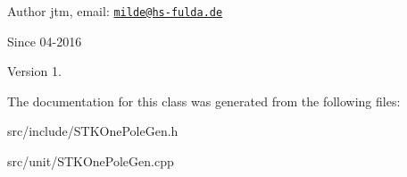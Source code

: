 \begin{DoxyAuthor}{Author}
jtm, email\-:  \href{mailto:milde@hs-fulda.de}{\tt milde@hs-\/fulda.\-de} 
\end{DoxyAuthor}
\begin{DoxySince}{Since}
04-\/2016 
\end{DoxySince}
\begin{DoxyVersion}{Version}
1. 
\end{DoxyVersion}


The documentation for this class was generated from the following files\-:\begin{DoxyCompactItemize}
\item 
src/include/S\-T\-K\-One\-Pole\-Gen.\-h\item 
src/unit/S\-T\-K\-One\-Pole\-Gen.\-cpp\end{DoxyCompactItemize}
